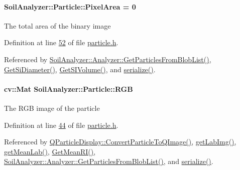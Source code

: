 \hypertarget{class_soil_analyzer_1_1_particle_ab1489af35ea29e20ee080c24ce617c66}{}
\paragraph[{Pixel\+Area}]{ Soil\+Analyzer\+::\+Particle\+::\+Pixel\+Area = 0}\label{class_soil_analyzer_1_1_particle_ab1489af35ea29e20ee080c24ce617c66}
The total area of the binary image 

Definition at line \hyperlink{particle_8h_source_l00052}{52} of file \hyperlink{particle_8h_source}{particle.\+h}.



Referenced by \hyperlink{analyzer_8cpp_source_l00322}{Soil\+Analyzer\+::\+Analyzer\+::\+Get\+Particles\+From\+Blob\+List()}, \hyperlink{particle_8cpp_source_l00068}{Get\+Si\+Diameter()}, \hyperlink{particle_8cpp_source_l00057}{Get\+S\+I\+Volume()}, and \hyperlink{particle_8h_source_l00083}{serialize()}.

\hypertarget{class_soil_analyzer_1_1_particle_a5c3457748fc4f3309bffdcb635c70458}{}
\paragraph[{R\+G\+B}]{\setlength{\rightskip}{0pt plus 5cm}cv\+::\+Mat Soil\+Analyzer\+::\+Particle\+::\+R\+G\+B}\label{class_soil_analyzer_1_1_particle_a5c3457748fc4f3309bffdcb635c70458}
The R\+G\+B image of the particle 

Definition at line \hyperlink{particle_8h_source_l00044}{44} of file \hyperlink{particle_8h_source}{particle.\+h}.



Referenced by \hyperlink{qparticledisplay_8cpp_source_l00050}{Q\+Particle\+Display\+::\+Convert\+Particle\+To\+Q\+Image()}, \hyperlink{particle_8cpp_source_l00138}{get\+Lab\+Img()}, \hyperlink{particle_8cpp_source_l00096}{get\+Mean\+Lab()}, \hyperlink{particle_8cpp_source_l00120}{Get\+Mean\+R\+I()}, \hyperlink{analyzer_8cpp_source_l00322}{Soil\+Analyzer\+::\+Analyzer\+::\+Get\+Particles\+From\+Blob\+List()}, and \hyperlink{particle_8h_source_l00083}{serialize()}.

